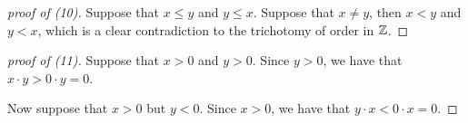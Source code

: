 \begin{proof}[proof of (10)]
    Suppose that \(x \leq y\) and \(y \leq x\). Suppose that \(x \neq y\), then \(x < y\) and \(y < x\), which is a clear contradiction to the trichotomy of order in \(\mathbb{Z}\).
\end{proof}
\begin{proof}[proof of (11)]
    Suppose that \(x > 0\) and \(y > 0\). Since \(y > 0\), we have that \(x \cdot y > 0 \cdot y = 0\).
    \par Now suppose that \(x > 0\) but \(y < 0\). Since \(x > 0\), we have that \(y \cdot x < 0 \cdot x = 0\).
\end{proof}
